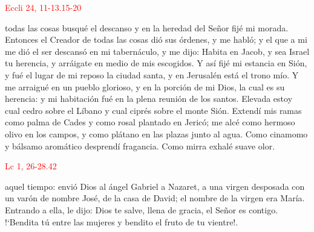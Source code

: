 \documentclass[10pt]{article}
\begin{document}
\begin{multicols}{2}
      \hfill\textcolor{red}{Eccli 24, 11-13.15-20}

      todas las cosas busqué el descanso y en la heredad del Señor fijé mi morada. Entonces el Creador de todas las cosas dió sus órdenes, y me habló; y el que a mi me dió el ser
      descansó en mi tabernáculo, y me dijo: Habita en Jacob, y sea Israel tu herencia, y arráigate en medio de mis escogidos. Y así fijé mi estancia en Sión, y fué el lugar de mi reposo
      la ciudad santa, y en Jerusalén está el trono mío. Y me arraigué en un pueblo glorioso, y en la porción de mi Dios, la cual es su herencia: y mi habitación fué en la plena reunión
      de los santos. Elevada estoy cual cedro sobre el Líbano y cual ciprés sobre el monte Sión. Extendí mis ramas como palma de Cades y como rosal plantado en Jericó; me alcé como hermoso
      olivo en los campos, y como plátano en las plazas junto al agua. Como cinamomo y bálsamo aromático desprendí fragancia. Como mirra exhalé suave olor.

      \vspace{2mm}

      \hfill\textcolor{red}{Lc 1, 26-28.42}

      aquel tiempo: envió Dios al ángel Gabriel a Nazaret, a una virgen desposada con un varón de nombre José, de la casa de David; el nombre de la virgen era María. 
      Entrando a ella, le dijo: Dios te salve, llena de gracia, el Señor es contigo. {!`}Bendita tú entre las mujeres y bendito el fruto de tu vientre!.

      \vspace{2mm}

      \begin{otherlanguage}{latin}
            

            \vspace{1mm}

            

            \vspace{1mm}

            

            \vspace{1mm}

            

            \vspace{1mm}


\end{otherlanguage}
\end{multicols}
\end{document}
